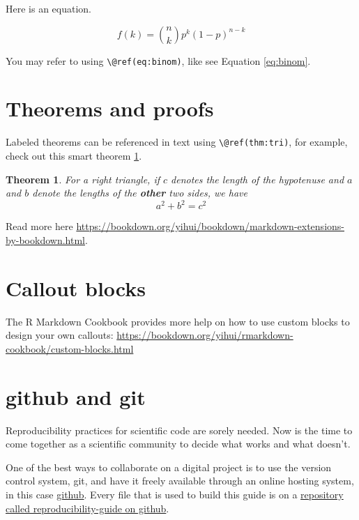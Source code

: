 \documentclass[
]{book}
\newtheorem{theorem}{Theorem}[chapter]
\theoremstyle{definition}
\theoremstyle{definition}
\theoremstyle{definition}
\theoremstyle{definition}
\theoremstyle{remark}
\begin{document}
Here is an equation.

\begin{equation} 
  f\left(k\right) = \binom{n}{k} p^k\left(1-p\right)^{n-k}
  \label{eq:binom}
\end{equation}

You may refer to using \texttt{\textbackslash{}@ref(eq:binom)}, like see Equation \eqref{eq:binom}.

\hypertarget{theorems-and-proofs}{%
\section{Theorems and proofs}\label{theorems-and-proofs}}

Labeled theorems can be referenced in text using \texttt{\textbackslash{}@ref(thm:tri)}, for example, check out this smart theorem \ref{thm:tri}.

\begin{theorem}
\protect\hypertarget{thm:tri}{}\label{thm:tri}For a right triangle, if \(c\) denotes the \emph{length} of the hypotenuse
and \(a\) and \(b\) denote the lengths of the \textbf{other} two sides, we have
\[a^2 + b^2 = c^2\]
\end{theorem}

Read more here \url{https://bookdown.org/yihui/bookdown/markdown-extensions-by-bookdown.html}.

\hypertarget{callout-blocks}{%
\section{Callout blocks}\label{callout-blocks}}

The R Markdown Cookbook provides more help on how to use custom blocks to design your own callouts: \url{https://bookdown.org/yihui/rmarkdown-cookbook/custom-blocks.html}

\hypertarget{github-and-git}{%
\section{github and git}\label{github-and-git}}

Reproducibility practices for scientific code are sorely needed. Now is the time to come together as a scientific community to decide what works and what doesn't.

One of the best ways to collaborate on a digital project is to use the version control system, git, and have it freely available through an online hosting system, in this case \href{https://github.com/}{github}. Every file that is used to build this guide is on a \href{https://github.com/ropensci/reproducibility-guide}{repository called reproducibility-guide on github}.
\end{document}
